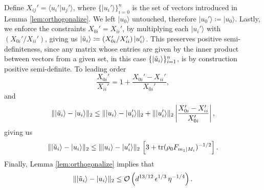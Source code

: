 Define $X_{ij}'=\langle u_i' \vert u_j'\rangle$, where $\{\vert u_i' \rangle\}_{i=0}^{n}$ is the set of vectors introduced in Lemma \ref{lem:orthogonalize}. We left $\vert u_0 \rangle$ untouched, therefore $\vert u_0' \rangle \coloneqq \vert u_0 \rangle$. 
Lastly, we enforce the constraints $X_{0i}'=X_{ii}'$, by multiplying each $\vert u_i' \rangle$ with $\left(X_{0i}'/X_{ii}'\right)$, giving us $\vert \Tilde{u}_i \rangle \coloneqq \left(X_{0i}'/X_{ii}'\right) \vert u_i' \rangle$. This preserves positive semi-definiteness, since any matrix whose entries are given by the inner product between vectors from a given set, in this case $\{\vert \Tilde{u}_i \rangle\}_{i=1}^n$, is by construction positive semi-definite. To leading order \[\frac{X_{0i}'}{X_{ii}'}=1+\frac{X_{0i}'-X_{ii}'}{X_{0i}'},\]
and \[\|\vert \Tilde{u}_i \rangle - \vert u_i \rangle\|_2 \leq \|\vert u_i \rangle -\vert u_i' \rangle\|_2+\|\vert u_i'\rangle\|_2 \left| \frac{X_{0i}'-X_{ii}'}{X_{0i}'} \right|,\]
giving us \[\|\vert \Tilde{u}_i \rangle - \vert u_i \rangle\|_2\leq \|\vert u_i \rangle -\vert u_i' \rangle\|_2\,\left[3+\operatorname{tr}(\rho_0 F_{m_1\vert M_i})^{-1/2}\right].\]
Finally, Lemma \ref{lem:orthogonalize} implies that \[\|\vert \Tilde{u}_i \rangle - \vert u_i \rangle\|_2 \leq \mathcal{O}\left(d^{13/12}\,\epsilon^{1/3}\,\eta^{-1/4}\right). \]